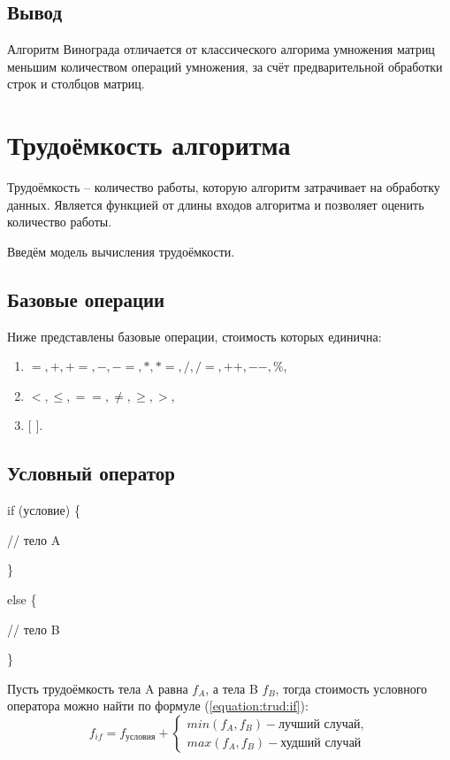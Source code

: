         \subsection{Вывод}
            Алгоритм Винограда отличается от классического алгорима умножения матриц меньшим количеством операций умножения, 
            за счёт предварительной обработки строк и столбцов матриц. 

    \section{Трудоёмкость алгоритма}
        Трудоёмкость -- количество работы, которую алгоритм затрачивает на обработку данных.
        Является функцией от длины входов алгоритма и позволяет оценить количество работы.

        Введём модель вычисления трудоёмкости.

        \subsection{Базовые операции}
            Ниже представлены базовые операции, стоимость которых единична:
            \begin{enumerate}
                \item $ =, +, +=, -, -=, *, *=,  /, /=, ++, --, \% $,
                \item $ <, \leqslant, ==, \neq, \geqslant , > $,
                \item $ [ $  $ ] $.
            \end{enumerate}
            
        \subsection{Условный оператор}
            if (условие) \{

                // тело A

            \}

            else \{

                // тело B
            
            \}

            Пусть трудоёмкость тела A равна $ f_A $, а тела B $ f_B $, тогда
            стоимость условного оператора можно найти по формуле (\ref{equation:trud:if}):
            \begin{equation}
                f_{if} = f_\text{условия} + \left\{
                    \begin{matrix}
                    min(f_A, f_B) - \text{лучший случай},\\
                    max(f_A, f_B) - \text{худший случай} 
                    \end{matrix}\right.
                \label{equation:trud:if}
            \end{equation}

